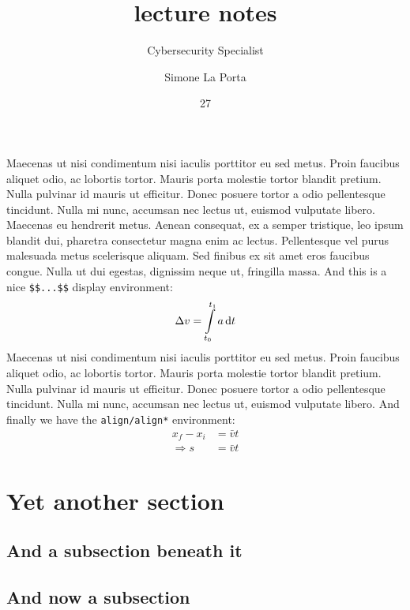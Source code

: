 \documentclass[english,course]{lecture}
\title{lecture notes}
\subtitle{Cybersecurity Specialist}
\author{Simone La Porta}
\date{27}{05}{2024}
\begin{document}


 Maecenas ut nisi condimentum nisi iaculis porttitor eu sed metus. Proin faucibus aliquet odio, ac lobortis tortor. Mauris porta molestie tortor blandit pretium. Nulla pulvinar id mauris ut efficitur. Donec posuere tortor a odio pellentesque tincidunt. Nulla mi nunc, accumsan nec lectus ut, euismod vulputate libero.
%
Maecenas eu hendrerit metus. Aenean consequat, ex a semper tristique, leo ipsum blandit dui, pharetra consectetur magna enim ac lectus. Pellentesque vel purus malesuada metus scelerisque aliquam. Sed finibus ex sit amet eros faucibus congue. Nulla ut dui egestas, dignissim neque ut, fringilla massa.
%
%
And this is a nice \texttt{\$\$...\$\$} display environment:
$$
\Delta v = \int\displaylimits_{t_0}^{t_1} a \, \textrm{d}t
$$
Maecenas ut nisi condimentum nisi iaculis porttitor eu sed metus. Proin faucibus aliquet odio, ac lobortis tortor. Mauris porta molestie tortor blandit pretium. Nulla pulvinar id mauris ut efficitur. Donec posuere tortor a odio pellentesque tincidunt. Nulla mi nunc, accumsan nec lectus ut, euismod vulputate libero.
%
And finally we have the \texttt{align/align*} environment:
\begin{align}
x_f - x_i &= \bar{v}t \nonumber\\
\Rightarrow s &= \bar{v}t
\end{align}
%
\section{Yet another section}
\subsection{And a subsection beneath it}
%
\subsection{And now a subsection}
\end{document}
